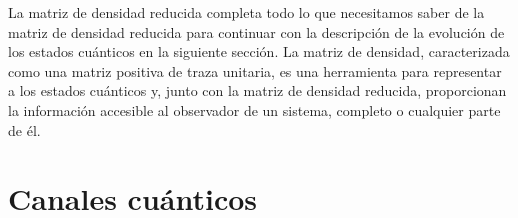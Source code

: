 
La matriz de densidad reducida completa todo lo que necesitamos 
saber de la matriz de densidad reducida para continuar con la descripción
de la evolución de los estados cuánticos en la siguiente sección. 
La matriz de densidad, caracterizada como una matriz positiva de traza unitaria, 
es una herramienta para representar a los estados cuánticos y, junto 
con la matriz de densidad reducida, proporcionan 
la información accesible al observador de un sistema, 
completo o cualquier parte de él. 

\section{Canales cuánticos}\label{sec:qtm-channels} %

